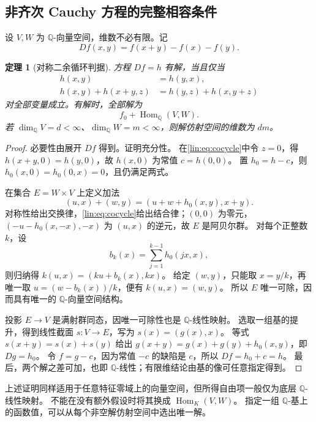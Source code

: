 \documentclass[11pt,a4paper,oneside,openany]{book}
\theoremstyle{lecture}
\newtheorem{theorem}{定理}[section]
\newcommand{\Q}{\mathbb Q}
\newcommand{\Hom}{\operatorname{Hom}}
\numberwithin{equation}{section}
\begin{document}
\subsection{非齐次 Cauchy 方程的完整相容条件}
设 $V,W$ 为 $\Q$-向量空间，维数不必有限。记
\[
 Df(x,y)=f(x+y)-f(x)-f(y).
\]
\begin{theorem}[对称二余循环判据]\label{lin:thm:cocycle}
方程 $Df=h$ 有解，当且仅当
\begin{align}
 h(x,y)&=h(y,x),\label{lin:eq:sym}\\
 h(x,y)+h(x+y,z)&=h(y,z)+h(x,y+z)\label{lin:eq:cocycle}
\end{align}
对全部变量成立。有解时，全部解为
\[
 f_0+\Hom_{\Q}(V,W).
\]
若 $\dim_{\Q}V=d<\infty$、$\dim_{\Q}W=m<\infty$，则解仿射空间的维数为 $dm$。
\end{theorem}
\begin{proof}
必要性由展开 $Df$ 得到。证明充分性。
在\eqref{lin:eq:cocycle}中令 $z=0$，得 $h(x+y,0)=h(y,0)$，故 $h(x,0)$ 为常值 $c=h(0,0)$。
置 $h_0=h-c$，则 $h_0(x,0)=h_0(0,x)=0$，且仍满足两式。

在集合 $E=W\times V$ 上定义加法
\[
 (u,x)+(w,y)=(u+w+h_0(x,y),x+y).
\]
对称性给出交换律，\eqref{lin:eq:cocycle}给出结合律；$(0,0)$ 为零元，
$(-u-h_0(x,-x),-x)$ 为 $(u,x)$ 的逆元，故 $E$ 是阿贝尔群。
对每个正整数 $k$，设
\[
 b_k(x)=\sum_{j=1}^{k-1}h_0(jx,x),
\]
则归纳得 $k(u,x)=(ku+b_k(x),kx)$。
给定 $(w,y)$，只能取 $x=y/k$，再唯一取 $u=(w-b_k(x))/k$，便有 $k(u,x)=(w,y)$。
所以 $E$ 唯一可除，因而具有唯一的 $\Q$-向量空间结构。

投影 $E\to V$ 是满射群同态，因唯一可除性也是 $\Q$-线性映射。
选取一组基的提升，得到线性截面 $s:V\to E$，写为 $s(x)=(g(x),x)$。
等式 $s(x+y)=s(x)+s(y)$ 给出
$g(x+y)=g(x)+g(y)+h_0(x,y)$，即 $Dg=h_0$。
令 $f=g-c$，因为常值 $-c$ 的缺陷是 $c$，所以 $Df=h_0+c=h$。
最后，两个解之差可加，也即 $\Q$-线性；有限维结论由基的像可任意指定得到。
\end{proof}
上述证明同样适用于任意特征零域上的向量空间，但所得自由项一般仅为底层 $\Q$-线性映射。
不能在没有额外假设时将其换成 $\Hom_K(V,W)$。
指定一组 $\Q$-基上的函数值，可以从每个非空解仿射空间中选出唯一解。
\end{document}
